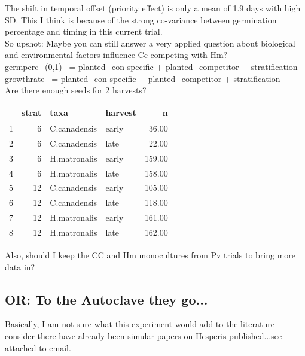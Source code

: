\documentclass{article}\usepackage[]{graphicx}\usepackage[]{color}
\begin{document}
 The shift in temporal offset (priority effect) is only a mean of 1.9 days with high SD. This I think is because of the strong co-variance between germination percentage and timing in this current trial.\\
 
 So upshot: Maybe you can still answer a very applied question about biological and environmental factors influence Cc competing with Hm?\\
 
 germperc_{(0,1)} \ = planted_{con-specific} $+$ planted_{competitor} $+$ stratification\\

 growthrate \ = planted_{con-specific} $+$ planted_{competitor} $+$ stratification\\
 
 Are there enough seeds for 2 harvests?\\
\begin{table}[ht]
\centering
\begin{tabular}{rrllr}
  \hline
 & strat & taxa & harvest & n \\ 
  \hline
1 &   6 & C.canadensis & early & 36.00 \\ 
  2 &   6 & C.canadensis & late & 22.00 \\ 
  3 &   6 & H.matronalis & early & 159.00 \\ 
  4 &   6 & H.matronalis & late & 158.00 \\ 
  5 &  12 & C.canadensis & early & 105.00 \\ 
  6 &  12 & C.canadensis & late & 118.00 \\ 
  7 &  12 & H.matronalis & early & 161.00 \\ 
  8 &  12 & H.matronalis & late & 162.00 \\ 
   \hline
\end{tabular}
\end{table}

Also, should I keep the CC and Hm monocultures from Pv trials to bring more data in?\\ 
\subsection{OR: To the Autoclave they go...}

Basically, I am not sure what this experiment would add to the literature consider there have already been simular papers on Hesperis published...see attached to email.\\
\end{document}
